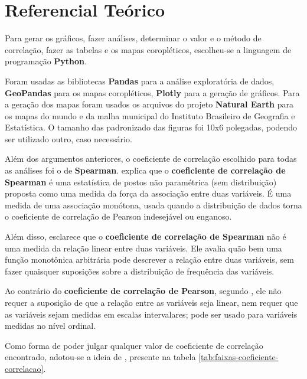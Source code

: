 \chapter{Referencial Teórico}

Para gerar os gráficos, fazer análises, determinar o valor e o método de correlação, fazer as tabelas e os mapas coropléticos, escolheu-se a linguagem de programação \textbf{Python}.

Foram usadas as bibliotecas \textbf{Pandas} para a análise exploratória de dados, \textbf{GeoPandas} para os mapas coropléticos, \textbf{Plotly} para a geração  de gráficos. Para a geração dos mapas foram usados os arquivos do projeto \textbf{Natural Earth} para os mapas do mundo e da malha municipal do Instituto Brasileiro de Geografia e Estatística. O tamanho das padronizado das figuras foi 10x6 polegadas, podendo ser utilizado outro, caso necessário.

Além dos argumentos anteriores, o coeficiente de correlação escolhido para todas as análises foi o de \textbf{Spearman}. \cite{hauke2011comparison} explica que o \textbf{coeficiente de correlação de Spearman} é uma estatística de postos não paramétrica (sem distribuição) proposta como uma medida da força da associação entre duas variáveis. É uma medida de uma associação monótona, usada quando a distribuição de dados torna o coeficiente de correlação de Pearson indesejável ou enganoso. 

Além disso, \cite{hauke2011comparison} esclarece que o \textbf{coeficiente de correlação de Spearman} não é uma medida da relação linear entre duas variáveis. Ele avalia quão bem uma função monotônica arbitrária pode descrever a relação entre duas variáveis, sem fazer quaisquer suposições sobre a distribuição de frequência das variáveis.

Ao contrário do \textbf{coeficiente de correlação de Pearson}, segundo \cite{hauke2011comparison}, ele não requer a suposição de que a relação entre as variáveis seja linear, nem requer que as variáveis sejam medidas em escalas intervalares; pode ser usado para variáveis medidas no nível ordinal.

Como forma de poder julgar qualquer valor de coeficiente de correlação encontrado, adotou-se a ideia de \cite{ali2022spearman}, presente na tabela \ref{tab:faixas-coeficiente-correlacao}.

